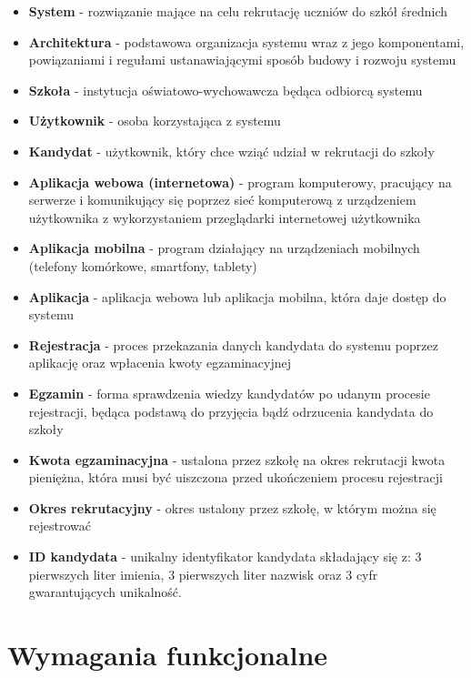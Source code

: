 \documentclass{article}
\begin{document}
\begin{itemize}
	\item \textbf{System} - rozwiązanie mające na celu rekrutację uczniów do szkół średnich
	\item \textbf{Architektura} - podstawowa organizacja systemu wraz z jego komponentami, powiązaniami i regułami ustanawiającymi sposób budowy i rozwoju systemu
	\item \textbf{Szkoła} - instytucja oświatowo-wychowawcza będąca odbiorcą systemu
	\item \textbf{Użytkownik} - osoba korzystająca z systemu
	\item \textbf{Kandydat} - użytkownik, który chce wziąć udział w rekrutacji do szkoły
	\item \textbf{Aplikacja webowa (internetowa)} - program komputerowy, pracujący na serwerze i komunikujący się poprzez sieć komputerową z urządzeniem użytkownika z wykorzystaniem przeglądarki internetowej użytkownika
	\item \textbf{Aplikacja mobilna} - program działający na urządzeniach mobilnych (telefony komórkowe, smartfony, tablety)
	\item \textbf{Aplikacja} - aplikacja webowa lub aplikacja mobilna, która daje dostęp do systemu
	\item \textbf{Rejestracja} - proces przekazania danych kandydata do systemu poprzez aplikację oraz wpłacenia kwoty egzaminacyjnej
	\item \textbf{Egzamin} - forma sprawdzenia wiedzy kandydatów po udanym procesie rejestracji, będąca podstawą do przyjęcia bądź odrzucenia kandydata do szkoły
	\item \textbf{Kwota egzaminacyjna} - ustalona przez szkołę na okres rekrutacji kwota pieniężna, która musi być uiszczona przed ukończeniem procesu rejestracji
	\item \textbf{Okres rekrutacyjny} - okres ustalony przez szkołę, w którym można się rejestrować
	\item \textbf{ID kandydata} - unikalny identyfikator kandydata składający się z: 3 pierwszych liter imienia, 3 pierwszych liter nazwisk oraz 3 cyfr gwarantujących unikalność.
\end{itemize}

\section{Wymagania funkcjonalne}
\end{document}
